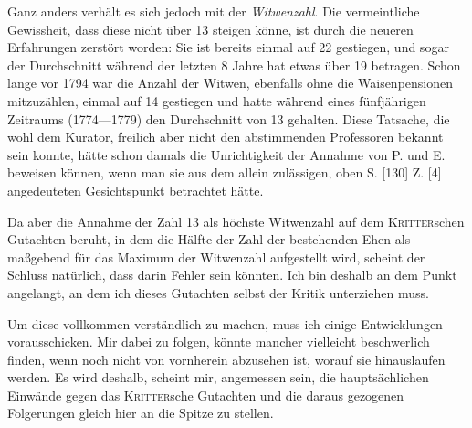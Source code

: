 Ganz anders verhält es sich jedoch mit der \textit{Witwenzahl}. Die vermeintliche Gewissheit, dass diese nicht über 13 steigen könne, ist durch die neueren Erfahrungen zerstört worden: Sie ist bereits einmal auf 22 gestiegen, und sogar der Durchschnitt während der letzten 8 Jahre hat etwas über 19 betragen. Schon lange vor 1794 war die Anzahl der Witwen, ebenfalls ohne die Waisenpensionen mitzuzählen, einmal auf 14 gestiegen und hatte während eines fünfjährigen Zeitraums (1774—1779) den Durchschnitt von 13 gehalten. Diese Tatsache, die wohl dem Kurator, freilich aber nicht den abstimmenden Professoren bekannt sein konnte, hätte schon damals die Unrichtigkeit der Annahme von P. und E. beweisen können, wenn man sie aus dem allein zulässigen, oben S. [130] Z. [4] angedeuteten Gesichtspunkt betrachtet hätte.

Da aber die Annahme der Zahl 13 als höchste Witwenzahl auf dem \textsc{Kritter}schen Gutachten beruht, in dem die Hälfte der Zahl der bestehenden Ehen als maßgebend für das Maximum der Witwenzahl aufgestellt wird, scheint der Schluss natürlich, dass darin Fehler sein könnten. Ich bin deshalb an dem Punkt angelangt, an dem ich dieses Gutachten selbst der Kritik unterziehen muss.
\par{}\noindent
Um diese vollkommen verständlich zu machen, muss ich einige Entwicklungen vorausschicken. Mir dabei zu folgen, könnte mancher vielleicht beschwerlich finden, wenn noch nicht von vornherein abzusehen ist, worauf sie hinauslaufen werden. Es wird deshalb, scheint mir, angemessen sein, die hauptsächlichen Einwände gegen das \textsc{Kritter}sche Gutachten und die daraus gezogenen Folgerungen gleich hier an die Spitze zu stellen.
